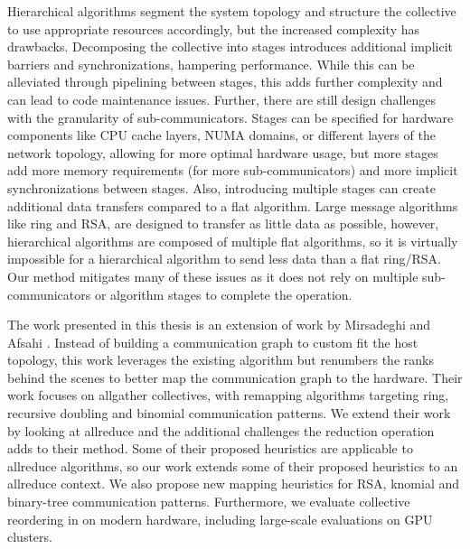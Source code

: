 Hierarchical algorithms segment the system topology and structure the collective to use appropriate resources accordingly, but the increased complexity has drawbacks.
Decomposing the collective into stages introduces additional implicit barriers and synchronizations, hampering performance. 
While this can be alleviated through pipelining between stages, this adds further complexity and can lead to code maintenance issues.
Further, there are still design challenges with the granularity of sub-communicators.
Stages can be specified for hardware components like \gls{CPU} cache layers, \gls{NUMA} domains, or different layers of the network topology, allowing for more optimal hardware usage, but more stages add more memory requirements (for more sub-communicators) and more implicit synchronizations between stages.
Also, introducing multiple stages can create additional data transfers compared to a flat algorithm.
Large message algorithms like ring and \gls{RSA}, are designed to transfer as little data as possible, however, hierarchical algorithms are composed of multiple flat algorithms, so it is virtually impossible for a hierarchical algorithm to send less data than a flat ring/\gls{RSA}.
Our method mitigates many of these issues as it does not rely on multiple sub-communicators or algorithm stages to complete the operation.

The work presented in this thesis is an extension of work by Mirsadeghi and Afsahi \cite{Mirsadeghi2016TopoAwareCollRR}.
Instead of building a communication graph to custom fit the host topology, this work leverages the existing algorithm but renumbers the ranks behind the scenes to better map the communication graph to the hardware.
Their work focuses on allgather collectives, with remapping algorithms targeting ring, recursive doubling and binomial communication patterns.
We extend their work by looking at allreduce and the additional challenges the reduction operation adds to their method.
Some of their proposed heuristics are applicable to allreduce algorithms, so our work extends some of their proposed heuristics to an allreduce context.
We also propose new mapping heuristics for \gls{RSA}, knomial and binary-tree communication patterns.
Furthermore, we evaluate collective reordering in on modern hardware, including large-scale evaluations on \gls{GPU} clusters.



